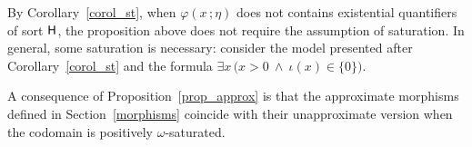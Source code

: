 \documentclass[10pt,oneside]{amsproc}
\begin{document}

\def\ceq#1#2#3{\parbox[t]{20ex}{$\displaystyle #1$}\parbox{5ex}{\hfil $#2$}{$\displaystyle #3$}}

  By Corollary~\ref{corol_st}, when $\varphi(x\,;\eta)$ does not contains existential quantifiers of sort ${\sf H}$, the proposition above does not require the assumption of saturation.
  In general, some saturation is necessary: consider the model presented after Corollary~\ref{corol_st} and the formula $\exists x\,\big(x>0\ \wedge\ \iota(x)\in\{0\}\big)$. 

\begin{remark}\label{rem_model_approx}
  A consequence of Proposition~\ref{prop_approx} is that the approximate morphisms defined in Section~\ref{morphisms} coincide with their unapproximate version when the codomain is positively $\omega$-saturated.
\end{remark}








  
\end{document}
